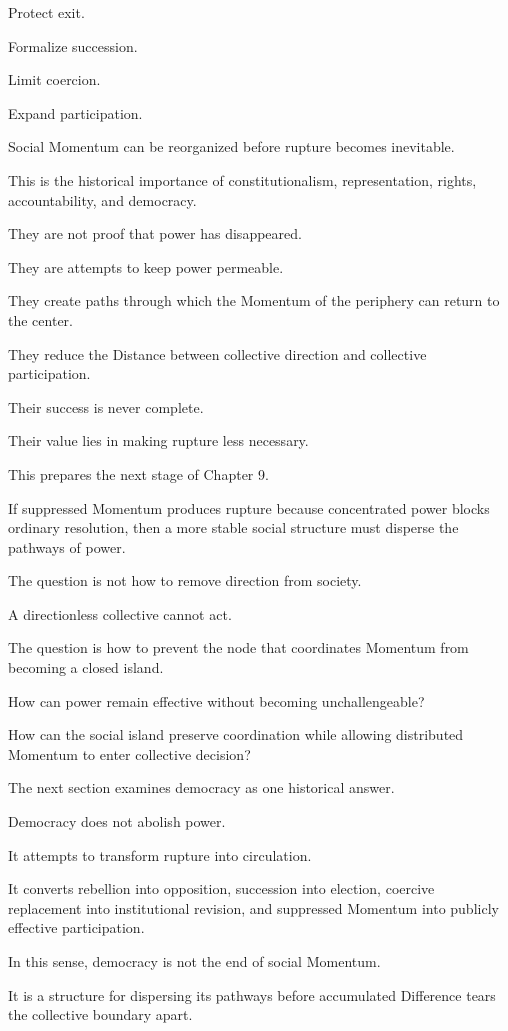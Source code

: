 Protect exit.

Formalize succession.

Limit coercion.

Expand participation.

Social Momentum can be reorganized before rupture becomes inevitable.

This is the historical importance of constitutionalism, representation, rights, accountability, and democracy.

They are not proof that power has disappeared.

They are attempts to keep power permeable.

They create paths through which the Momentum of the periphery can return to the center.

They reduce the Distance between collective direction and collective participation.

Their success is never complete.

Their value lies in making rupture less necessary.

This prepares the next stage of Chapter 9.

If suppressed Momentum produces rupture because concentrated power blocks ordinary resolution, then a more stable social structure must disperse the pathways of power.

The question is not how to remove direction from society.

A directionless collective cannot act.

The question is how to prevent the node that coordinates Momentum from becoming a closed island.

How can power remain effective without becoming unchallengeable?

How can the social island preserve coordination while allowing distributed Momentum to enter collective decision?

The next section examines democracy as one historical answer.

Democracy does not abolish power.

It attempts to transform rupture into circulation.

It converts rebellion into opposition, succession into election, coercive replacement into institutional revision, and suppressed Momentum into publicly effective participation.

In this sense, democracy is not the end of social Momentum.

It is a structure for dispersing its pathways before accumulated Difference tears the collective boundary apart.

